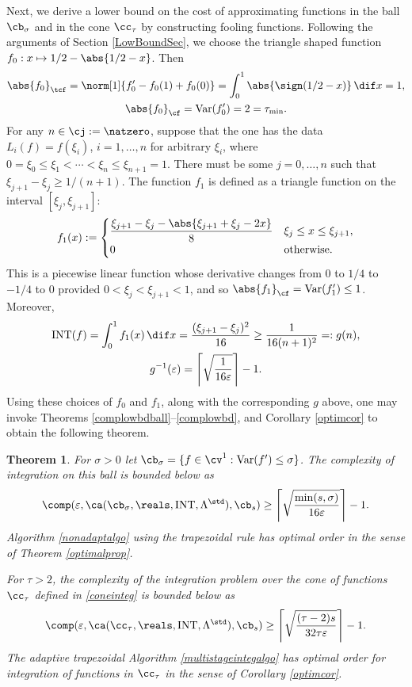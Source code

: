 \documentclass{iitthesis}
\DeclareMathOperator{\Var}{Var}
\DeclareMathOperator{\INT}{INT}
\newtheorem{theorem}{Theorem}
\theoremstyle{definition}
\theoremstyle{remark}
\newcommand{\Fnorm}[1]{\abs{#1}_{\cf}}
\newcommand{\Ftnorm}[1]{\abs{#1}_{\tcf}}
\begin{document}
Next, we derive a lower bound on the cost of approximating functions in the ball $\cb_{\sigma}$ and in the cone $\cc_{\tau}$ by constructing fooling functions. Following the arguments of Section \ref{LowBoundSec}, we choose  the triangle shaped function $f_0: x \mapsto 1/2-\abs{1/2-x}$. Then
\begin{gather*}
\Ftnorm{f_0}=\norm[1]{f'_0-f_0(1)+f_0(0)}=\int_0^1 \abs{\sign(1/2-x)} \, \dif x = 1, \\ \Fnorm{f_0}=\Var(f'_0)=2= \tau_{\min}.
\end{gather*}
For any $n \in \cj:=\natzero$, suppose that the one has the data $L_i(f)=f(\xi_i)$, $i=1, \ldots, n$ for arbitrary $\xi_i$, where $0=\xi_0 \le \xi_1 < \cdots < \xi_n \le \xi_{n+1} = 1$.  There must be some $j=0, \ldots, n$ such that $\xi_{j+1} - \xi_j \ge 1/(n+1)$.  The function $f_{1}$ is defined as a triangle function on the interval $[\xi_j, \xi_{j+1}]$:
$$
f_{1}(x):=\begin{cases} \displaystyle
\frac{\xi_{j+1}-\xi_{j}-\abs{\xi_{j+1}+\xi_{j}-2x}}{8} & \xi_{j} \le x \leq \xi_{j+1},\\
0 & \text{otherwise}.
\end{cases}
$$
This is a piecewise linear function whose derivative changes from $0$ to $1/4$ to $-1/4$ to $0$ provided $0 < \xi_j < \xi_{j+1} < 1$, and so $\Fnorm{f_1}=\Var(f'_1)\le 1$. Moreover,
\begin{gather*}
\INT(f)=\int_0^1 f_1(x) \, \dif x = \frac{(\xi_{j+1} - \xi_j)^2}{16} \ge \frac{1}{16(n+1)^2} =: g(n),\\
g^{-1}(\varepsilon)=\left \lceil \sqrt{\frac{1}{16 \varepsilon}} \right \rceil - 1.
\end{gather*}
Using these choices of $f_0$ and $f_1$, along with the corresponding $g$ above, one may invoke Theorems \ref{complowbdball}--\ref{complowbd}, and Corollary \ref{optimcor} to obtain the following theorem.

\begin{theorem} \label{complowbdinteg} For $\sigma>0$ let $\cb_{\sigma}=\{f \in \cv^{1} : \Var(f') \le \sigma\}$.  The complexity of integration on this ball is bounded below as
\begin{equation*}
\comp(\varepsilon,\ca(\cb_{\sigma},\reals,\INT,\Lambda^{\std}),\cb_{s}) \ge \left \lceil \sqrt{\frac{\min(s,\sigma)}{16 \varepsilon}} \right \rceil -1 .
\end{equation*}
Algorithm \ref{nonadaptalgo} using the trapezoidal rule has optimal order in the sense of Theorem \ref{optimalprop}.

For $\tau>2$, the complexity of the integration problem over the cone of functions $\cc_{\tau}$ defined in \eqref{coneinteg} is bounded below as
\begin{equation*}
\comp(\varepsilon,\ca(\cc_{\tau},\reals,\INT,\Lambda^{\std}),\cb_{s}) \ge \left \lceil \sqrt{\frac{(\tau-2)s}{32 \tau \varepsilon}} \right \rceil -1 .
\end{equation*}
The adaptive trapezoidal Algorithm \ref{multistageintegalgo} has optimal order for integration of functions in $\cc_{\tau}$ in the sense of Corollary \ref{optimcor}.
\end{theorem}
\end{document}
